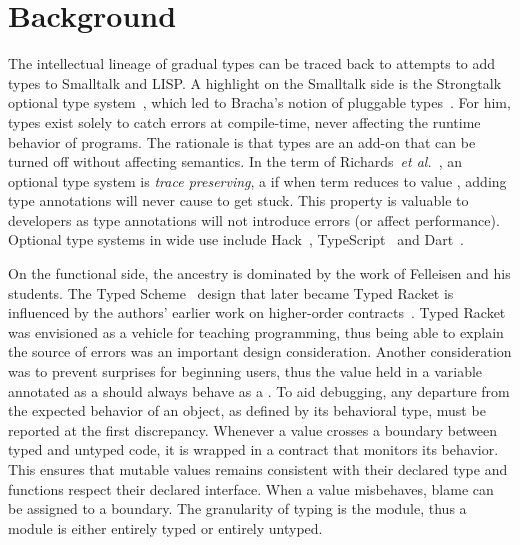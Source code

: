 \documentclass[runnningheads]{tex/llncs}
\begin{document}
\section{Background}


\noindent The intellectual lineage of gradual types can be traced back to
attempts to add types to Smalltalk and LISP. A highlight on the Smalltalk
side is the Strongtalk optional type system~\cite{Bracha93}, which led to
Bracha's notion of pluggable types~\cite{pluggabletypes}. For him, types
exist solely to catch errors at compile-time, never affecting the runtime
behavior of programs. The rationale is that types are an add-on that can be
turned off without affecting semantics.  In the term of Richards~\emph{et
  al.}~\cite{ecoop15}, an optional type system is \emph{trace preserving}, a
if when term \e reduces to value \a, adding type annotations will never
cause \e to get stuck. This property is valuable to developers as type
annotations will not introduce errors (or affect performance).  Optional
type systems in wide use include Hack~\cite{hack13}, TypeScript~\cite{BAT14}
and Dart~\cite{dart13}.

On the functional side, the ancestry is dominated by the work of Felleisen
and his students.  The Typed Scheme~\cite{tf-popl08} design that later
became Typed Racket is influenced by the authors' earlier work on
higher-order contracts~\cite{ff-icfp02}. Typed Racket was envisioned as a
vehicle for teaching programming, thus being able to explain the source of
errors was an important design consideration. Another consideration was to
prevent surprises for beginning users, thus the value held in a variable
annotated as a \C should always behave as a \C. To aid debugging, any
departure from the expected behavior of an object, as defined by its
behavioral type, must be reported at the first discrepancy.  Whenever a value
crosses a boundary between typed and untyped code, it is wrapped in a
contract that monitors its behavior. This ensures that mutable values
remains consistent with their declared type and functions respect their
declared interface. When a value misbehaves, blame can be assigned to a
boundary. The granularity of typing is the module, thus a module is either
entirely typed or entirely untyped. 
\end{document}
